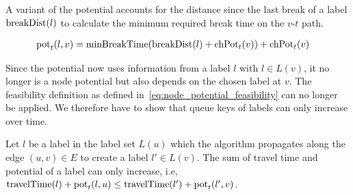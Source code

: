 A variant of the potential accounts for the distance since the last break of a label $\operatorname{breakDist}(l)$ to calculate the minimum required break time on the $v$-$t$ path.

\begin{align}
	\begin{split}
		\operatorname{pot}_t(l,v) & = \operatorname{minBreakTime}(\operatorname{breakDist}(l) + \operatorname{chPot}_t(v)) +\operatorname{chPot}_t(v)
	\end{split}
\end{align}

Since the potential now uses information from a label $l$ with $l \in L(v)$, it no longer is a node potential but also depends on the chosen label at $v$. The feasibility definition as defined in~\ref{eq:node_potential_feasibility} can no longer be applied. We therefore have to show that queue keys of labels can only increase over time.

\begin{lemma}\label{lemma:pot_labels_get_larger}
	Let $l$ be a label in the label set $L(u)$ which the algorithm propagates along the edge $(u,v) \in E$ to create a label $l' \in L(v)$. The sum of travel time and potential of a label can only increase, i.e, $\operatorname{travelTime}(l) + \operatorname{pot}_t(l,u) \le \operatorname{travelTime}(l') + \operatorname{pot}_t(l',v)$.
\end{lemma}

